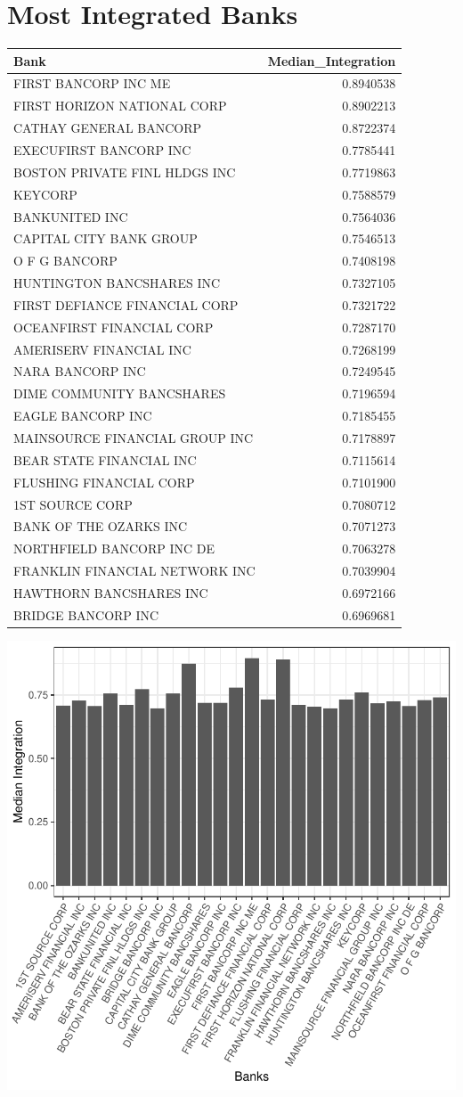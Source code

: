 \documentclass[11pt,]{article}
\begin{document}
\section{Most Integrated Banks}\label{most-integrated-banks}

\begin{longtable}[]{@{}lr@{}}
\toprule
Bank & Median\_Integration\tabularnewline
\midrule
\endhead
FIRST BANCORP INC ME & 0.8940538\tabularnewline
FIRST HORIZON NATIONAL CORP & 0.8902213\tabularnewline
CATHAY GENERAL BANCORP & 0.8722374\tabularnewline
EXECUFIRST BANCORP INC & 0.7785441\tabularnewline
BOSTON PRIVATE FINL HLDGS INC & 0.7719863\tabularnewline
KEYCORP & 0.7588579\tabularnewline
BANKUNITED INC & 0.7564036\tabularnewline
CAPITAL CITY BANK GROUP & 0.7546513\tabularnewline
O F G BANCORP & 0.7408198\tabularnewline
HUNTINGTON BANCSHARES INC & 0.7327105\tabularnewline
FIRST DEFIANCE FINANCIAL CORP & 0.7321722\tabularnewline
OCEANFIRST FINANCIAL CORP & 0.7287170\tabularnewline
AMERISERV FINANCIAL INC & 0.7268199\tabularnewline
NARA BANCORP INC & 0.7249545\tabularnewline
DIME COMMUNITY BANCSHARES & 0.7196594\tabularnewline
EAGLE BANCORP INC & 0.7185455\tabularnewline
MAINSOURCE FINANCIAL GROUP INC & 0.7178897\tabularnewline
BEAR STATE FINANCIAL INC & 0.7115614\tabularnewline
FLUSHING FINANCIAL CORP & 0.7101900\tabularnewline
1ST SOURCE CORP & 0.7080712\tabularnewline
BANK OF THE OZARKS INC & 0.7071273\tabularnewline
NORTHFIELD BANCORP INC DE & 0.7063278\tabularnewline
FRANKLIN FINANCIAL NETWORK INC & 0.7039904\tabularnewline
HAWTHORN BANCSHARES INC & 0.6972166\tabularnewline
BRIDGE BANCORP INC & 0.6969681\tabularnewline
\bottomrule
\end{longtable}

\begin{center}\includegraphics{AC_US_Bank_Int_Results_1_files/figure-latex/most_int-1} \end{center}
\end{document}
